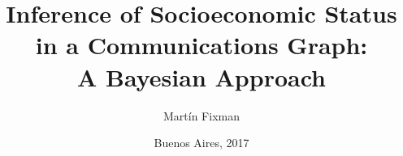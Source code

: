 \documentclass[runningheads]{dalthesis/dalthesis}
\title{Inference of Socioeconomic Status\\in a Communications Graph:\\A Bayesian Approach}
\author{Martín Fixman}
\date{Buenos Aires, 2017}
\numberwithin{equation}{section}
\begin{document}


\frontmatter

\begin{abstract}
	
\end{abstract}



\mainmatter

















{}
\end{document}
